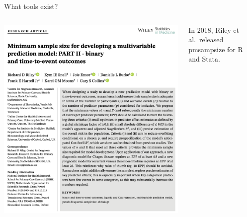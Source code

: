 \documentclass[11pt]{beamer}
\newcommand{\bgap}{\vspace{0.8em}}
\begin{document}
\begin{frame}[t]{What tools exist?}
	\bgap

	\begin{columns}
		\begin{column}[c]{0.6\textwidth}
			\includegraphics[width=\textwidth]{figures/riley2.png}%
		\end{column}
		\begin{column}[T]{0.4\textwidth}
			\centering
			\vspace{-4em}
			In 2018, Riley et al.\ released pmsampsize\autocite{riley2021} for R and Stata.
		\end{column}
	\end{columns}

\end{frame}
\end{document}

